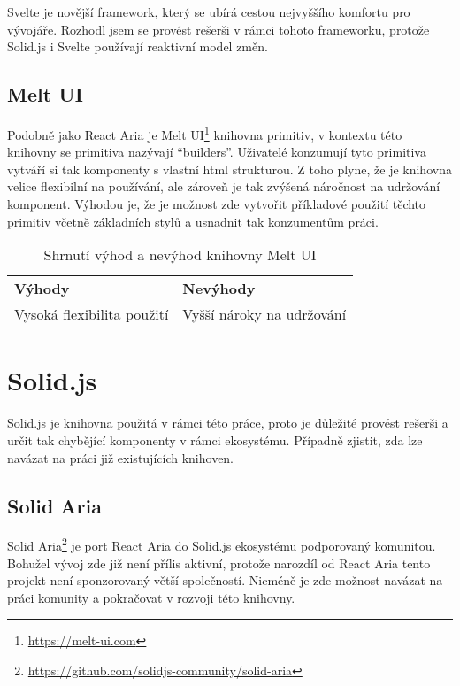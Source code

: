 Svelte je novější framework, který se ubírá cestou nejvyššího komfortu pro vývojáře.
Rozhodl jsem se provést rešerši v rámci tohoto frameworku, protože Solid.js i Svelte používají reaktivní model změn.

\subsection{Melt UI}

Podobně jako React Aria je Melt UI\footnote{\url{https://melt-ui.com}} knihovna primitiv, v kontextu této knihovny se primitiva nazývají ``builders''.
Uživatelé konzumují tyto primitiva vytváří si tak komponenty s vlastní \gls{html} strukturou.
Z toho plyne, že je knihovna velice flexibilní na používání, ale zároveň je tak zvýšená náročnost na udržování komponent.
Výhodou je, že je možnost zde vytvořit příkladové použití těchto primitiv včetně základních stylů a usnadnit tak konzumentům práci.

\begin{table}[ht]
    \begin{ctucolortab}
        \begin{tabularx}{\textwidth}{Y Y}
            \bfseries \textcolor{OK}{Výhody} & \bfseries \textcolor{NOT_OK}{Nevýhody} \\\Midrule{}
            Vysoká flexibilita použití       & Vyšší nároky na udržování
        \end{tabularx}
    \end{ctucolortab}
    \caption{Shrnutí výhod a nevýhod knihovny Melt UI}
\end{table}

\section{Solid.js}
\label{sec:solid}

Solid.js je knihovna použitá v rámci této práce, proto je důležité provést rešerši a určit tak chybějící komponenty v rámci ekosystému.
Případně zjistit, zda lze navázat na práci již existujících knihoven.

\subsection{Solid Aria}

Solid Aria\footnote{\url{https://github.com/solidjs-community/solid-aria}} je port React Aria do Solid.js ekosystému podporovaný komunitou.
Bohužel vývoj zde již není přílis aktivní, protože narozdíl od React Aria tento projekt není sponzorovaný větší společností.
Nicméně je zde možnost navázat na práci komunity a pokračovat v rozvoji této knihovny.

